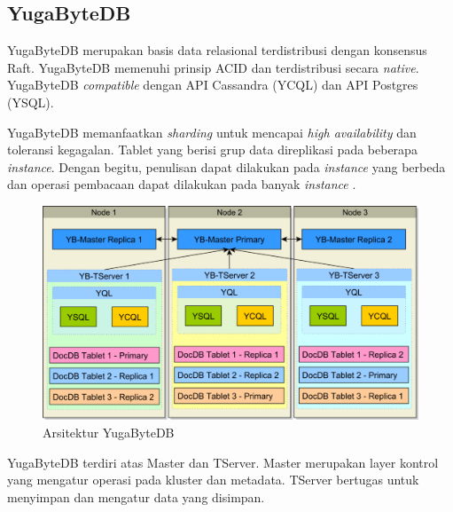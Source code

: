 \subsection{YugaByteDB}

YugaByteDB merupakan basis data relasional terdistribusi dengan konsensus Raft. YugaByteDB memenuhi prinsip ACID dan terdistribusi secara \textit{native}. YugaByteDB \textit{compatible} dengan API Cassandra (YCQL) dan API Postgres (YSQL).

YugaByteDB memanfaatkan \textit{sharding} untuk mencapai \textit{high availability} dan toleransi kegagalan. Tablet yang berisi grup data direplikasi pada beberapa \textit{instance}. Dengan begitu, penulisan dapat dilakukan pada \textit{instance} yang berbeda dan operasi pembacaan dapat dilakukan pada banyak \textit{instance} \parencite{yugabyteBaeldung}.

\begin{figure}[htbp]
    \centering
    \includegraphics[width=1\textwidth]{resources/chapter-2/yugabyte.png}
    \caption{Arsitektur YugaByteDB \parencite{yugabyteBaeldung}}
    \label{fig:yugabyte-architecture}
\end{figure}

YugaByteDB terdiri atas Master dan TServer. Master merupakan layer kontrol yang mengatur operasi pada kluster dan metadata. TServer bertugas untuk menyimpan dan mengatur data yang disimpan.
